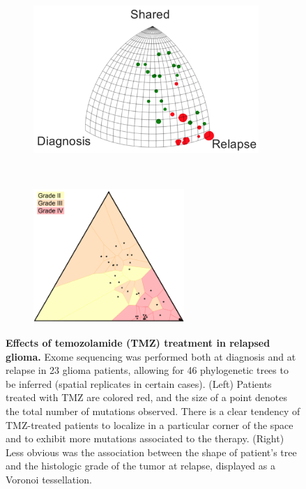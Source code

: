 \documentclass[a4paper,11pt]{article}
\begin{document}
\begin{figure}
    \begin{subfigure}{0.5\linewidth}
    \centering
    \includegraphics[height=2.2in]{../figures/glioma_triplet.png}
    \end{subfigure}
    ~
    \begin{subfigure}{0.5\linewidth}
    \centering
    \includegraphics[height=2in]{../figures/glioma_voronoi_stage.png}
    \end{subfigure}

    \caption{{\bf Effects of temozolamide (TMZ) treatment in relapsed glioma.} Exome sequencing was performed both at diagnosis and at relapse in 23 glioma patients, allowing for 46 phylogenetic trees to be inferred (spatial replicates in certain cases). (Left) Patients treated with TMZ are colored red, and the size of a point denotes the total number of mutations observed. There is a clear tendency of TMZ-treated patients to localize in a particular corner of the space and to exhibit more mutations associated to the therapy. (Right) Less obvious was the association between the shape of patient's tree and the histologic grade of the tumor at relapse, displayed as a Voronoi tessellation.}
    \label{fig:gliomaTMZ}
\end{figure}
\end{document}
